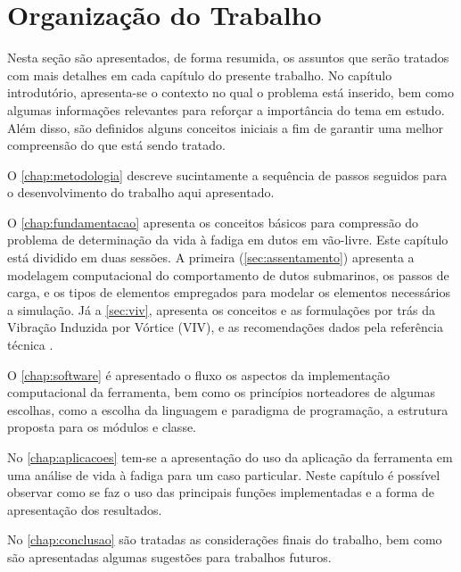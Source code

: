 \section{Organização do Trabalho}

Nesta seção são apresentados, de forma resumida, os assuntos que serão tratados com mais detalhes em cada capítulo do presente trabalho. No capítulo introdutório, apresenta-se o contexto no qual o problema está inserido, bem como algumas informações relevantes para reforçar a importância do tema em estudo. Além disso, são definidos alguns conceitos iniciais a fim de garantir uma melhor compreensão do que está sendo tratado.

O \autoref{chap:metodologia} descreve sucintamente a sequência de passos seguidos para o desenvolvimento do trabalho aqui apresentado.

O \autoref{chap:fundamentacao} apresenta os conceitos básicos para compressão do problema de determinação da vida à fadiga em dutos em vão-livre. Este capítulo está dividido em duas sessões. A primeira (\autoref{sec:assentamento}) apresenta a modelagem computacional do comportamento de dutos submarinos, os passos de carga, e os tipos de elementos empregados para modelar os elementos necessários a simulação. Já a \autoref{sec:viv}, apresenta os conceitos e as formulações por trás da Vibração Induzida por Vórtice (VIV), e as recomendações dados pela referência técnica .

O \autoref{chap:software} é apresentado o fluxo  os aspectos da implementação computacional da ferramenta, bem como os princípios norteadores de algumas escolhas, como a escolha da linguagem e paradigma de programação, a estrutura proposta para os módulos e classe.

No \autoref{chap:aplicacoes} tem-se a apresentação do uso da aplicação da ferramenta em uma análise de vida à fadiga para um caso particular. Neste capítulo é possível observar como se faz o uso das principais funções implementadas e a forma de apresentação dos resultados.

No \autoref{chap:conclusao} são tratadas as considerações finais do trabalho, bem como são apresentadas algumas sugestões para trabalhos futuros.